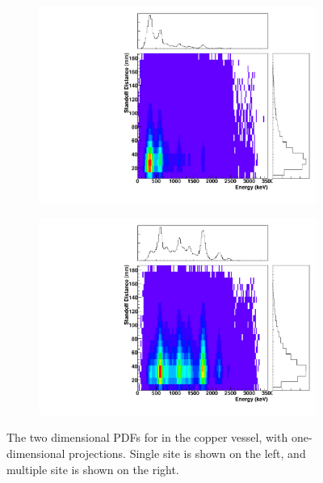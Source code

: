\documentclass[herrin-thesis.tex]{subfiles}
\begin{document}
\begin{figure}[hp]
\centering
	\begin{subfigure}[b]{0.35\textwidth}
	\centering
	\includegraphics[width=\textwidth]{./plots/PDFs/analysis_pdf_AllVessel_U238_ss.pdf}
\end{subfigure}\hspace{0.1\textwidth}%
\begin{subfigure}[b]{0.35\textwidth}
	\centering
	\includegraphics[width=1\textwidth]{./plots/PDFs/analysis_pdf_AllVessel_U238_ms.pdf}
	\end{subfigure}
\caption[PDF for  in the TPC vessel]{The two dimensional PDFs for  in the copper vessel, with one-dimensional projections. Single site is shown on the left, and multiple site is shown on the right.}
\label{fig:analysis_pdf_AllVessel_U238}
\end{figure}
\end{document}
